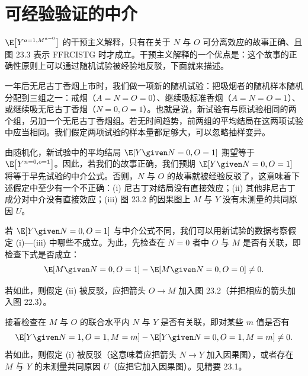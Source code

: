 \section{可经验验证的中介}

$\E\big[Y^{a=1,M^{a=0}}\big]$ 的干预主义解释，只有在关于 $N$ 与 $O$ 可分离效应的故事正确、且图 23.3 表示 FFRCISTG 时才成立。干预主义解释的一个优点是：这个故事的正确性原则上可以通过随机试验被经验地反驳，下面就来描述。

一年后无尼古丁香烟上市时，我们做一项新的随机试验：把吸烟者的随机样本随机分配到三组之一：戒烟（$A=N=O=0$）、继续吸标准香烟（$A=N=O=1$）、或继续吸无尼古丁香烟（$N=0,O=1$）。也就是说，新试验有与原试验相同的两个组，另加一个无尼古丁香烟组。若无时间趋势，前两组的平均结局在这两项试验中应当相同。我们假定两项试验的样本量都足够大，可以忽略抽样变异。

由随机化，新试验中的平均结局 $\E[Y\given N=0,O=1]$ 期望等于 $\E\big[Y^{n=0,o=1}\big]$。因此，若我们的故事正确，我们预期 $\E[Y\given N=0,O=1]$ 将等于早先试验的中介公式。否则，$N$ 与 $O$ 的故事就被经验反驳了，这意味着下述假定中至少有一个不正确：(i) 尼古丁对结局没有直接效应；(ii) 其他非尼古丁成分对中介没有直接效应；(iii) 图 23.2 的因果图上 $M$ 与 $Y$ 没有未测量的共同原因 $U$。

若 $\E[Y\given N=0,O=1]$ 与中介公式不同，我们可以用新试验的数据考察假定 (i)—(iii) 中哪些不成立。为此，先检查在 $N=0$ 者中 $O$ 与 $M$ 是否有关联，即检查下式是否成立：
\[
\E[M\given N=0,O=1]-\E[M\given N=0,O=0]\neq 0.
\]

若如此，则假定 (ii) 被反驳，应把箭头 $O\rightarrow M$ 加入图 23.2（并把相应的箭头加入图 22.3）。

接着检查在 $M$ 与 $O$ 的联合水平内 $N$ 与 $Y$ 是否有关联，即对某些 $m$ 值是否有
\[
\E[Y\given N=1,O=1,M=m]-\E[Y\given N=0,O=1,M=m]\neq 0.
\]
若如此，则假定 (i) 被反驳（这意味着应把箭头 $N\rightarrow Y$ 加入因果图），或者存在 $M$ 与 $Y$ 的未测量共同原因 $U$（应把它加入因果图）。见精要 23.1。

